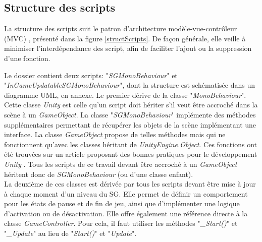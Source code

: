 	\subsection*{Structure des scripts}
		La structure des scripts suit le patron d'architecture modèle-vue-contrôleur (MVC) \cite{UnityMVC}, présenté dans la figure \ref{structScripts}. De façon générale, elle veille à minimiser l'interdépendance des script, afin de faciliter l'ajout ou la suppression d'une fonction.\medskip
		
		\begin{minipage}{\linewidth}
			\label{structScripts}
		\end{minipage}\medskip
		
		Le dossier contient deux scripts: "\textit{SGMonoBehaviour}" et "\textit{InGameUpdatableSGMonoBehaviour}", dont la structure est schématisée dans un diagramme UML, en annexe. Le premier dérive de la classe "\textit{MonoBehaviour}". Cette classe \textit{Unity} est celle qu'un script doit hériter s'il veut être accroché dans la scène à un \textit{GameObject}. La classe "\textit{SGMonoBehaviour}" implémente des méthodes supplémentaires permettant de récupérer les objets de la scène implémentant une interface. La classe \textit{GameObject} propose de telles méthodes mais qui ne fonctionnent qu'avec les classes héritant de \textit{UnityEngine.Object}. Ces fonctions ont été trouvées sur un article proposant des bonnes pratiques pour le développement \textit{Unity} \cite{Unity50Tips}. Tous les scripts de ce travail devant être accroché à un \textit{GameObject} héritent donc de \textit{SGMonoBehaviour} (ou d'une classe enfant).
		\\
		
		La deuxième de ces classes est dérivée par tous les scripts devant être mise à jour à chaque moment d'un niveau du SG. Elle permet de définir un comportement pour les états de pause et de fin de jeu, ainsi que d'implémenter une logique d'activation ou de désactivation. Elle offre également une référence directe à la classe \textit{GameController}. Pour cela, il faut utiliser les méthodes "\textit{\_Start()}" et "\textit{\_Update}" au lieu de "\textit{Start()}" et "\textit{Update}".
		\\
		
